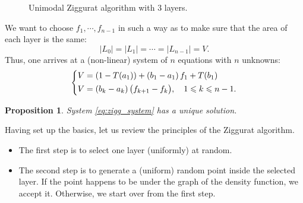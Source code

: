 \documentclass{article}
\renewcommand{\leq}{\leqslant}
\newtheorem{proposition}{Proposition}
\theoremstyle{definition} %
\newcommand{\Mode}{\theta}
\begin{document}
\begin{figure}[!ht]
    \caption{Unimodal Ziggurat algorithm with $3$ layers.}
    \label{fig:ziggurat:3_layers}
\end{figure}
%
We want to choose $f_1, \cdots , f_{n - 1}$ in such a way as to make sure that the area of each layer is the same:
\[
    |L_0| = |L_1| = \cdots = |L_{n - 1}| = V.
\]
Thus, one arrives at a (non-linear) system of $n$ equations with $n$ unknowns:
\begin{align} \label{eq:zigg_system}
    \begin{dcases}
        V = (1 - T(a_1)) + (b_1 - a_1) \, f_1 + T(b_1) \\
        V = (b_k - a_k) \, \big( f_{k + 1} - f_k \big), \quad 1 \leq k \leq n - 1.
    \end{dcases}
\end{align}

\begin{proposition}
    System \eqref{eq:zigg_system} has a unique solution.
\end{proposition}

Having set up the basics, let us review the principles of the Ziggurat algorithm.
\begin{itemize}
    \item The first step is to select one layer (uniformly) at random.
    \item The second step is to generate a (uniform) random point inside the selected layer. If the point happens to be under the graph of the density function, we accept it. Otherwise, we start over from the first step.
\end{itemize}
\end{document}
